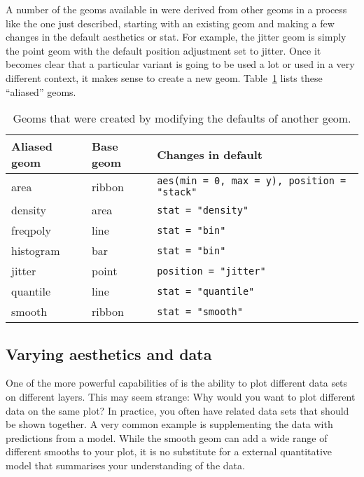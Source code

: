 A number of the geoms available in \ggplot were derived from other geoms in a process like the one just described, starting with an existing geom and making a few changes in the default aesthetics or stat.  For example, the jitter geom is simply the point geom with the default position adjustment set to jitter.  Once it becomes clear that a particular variant is going to be used a lot or used in a very different context, it makes sense to create a new geom. Table~\ref{tbl:aliased-geoms} lists these ``aliased'' geoms.

\begin{table}
  \begin{center}
  \begin{tabular}{lll}
    \toprule
    Aliased geom & Base geom & Changes in default \\
    \midrule
    area      & ribbon & \verb!aes(min = 0, max = y), position = "stack"!  \\
    density   & area   & \verb!stat = "density"!    \\
    freqpoly  & line   & \verb!stat = "bin"!        \\
    histogram & bar    & \verb!stat = "bin"!        \\
    jitter    & point  & \verb!position = "jitter"! \\
    quantile  & line   & \verb!stat = "quantile"!   \\
    smooth    & ribbon & \verb!stat = "smooth"!     \\
    \bottomrule
  \end{tabular}
  \end{center}
  \caption{Geoms that were created by modifying the defaults of another geom.}
  \label{tbl:aliased-geoms}
\end{table}

\subsection{Varying aesthetics and data}
\label{sub:different_aesthetics}

One of the more powerful capabilities of \ggplot is the ability to plot different data sets on different layers.  This may seem strange: Why would you want to plot different data on the same plot?  In practice, you often have related data sets that should be shown together.  A very common example is supplementing the data with predictions from a model.  While the smooth geom can add a wide range of different smooths to your plot, it is no substitute for a external quantitative model that summarises your understanding of the data.

